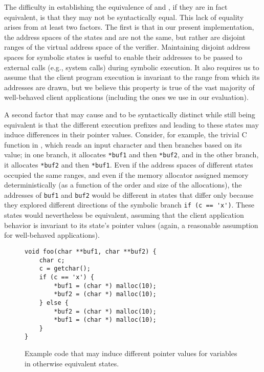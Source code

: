 The difficulty in establishing the equivalence of
 and , if they are in
fact equivalent, is that they may not be syntactically equal.  This
lack of equality arises from at least two factors.  The first is that
in our present implementation, the address spaces of the states
 and  are not the same,
but rather are disjoint ranges of the virtual address space of the
verifier.  Maintaining disjoint address spaces for symbolic states is
useful to enable their addresses to be passed to external calls (e.g.,
system calls) during symbolic execution.  It also requires us to
assume that the client program execution is invariant to the range
from which its addresses are drawn, but we believe this property is
true of the vast majority of well-behaved client applications
(including the ones we use in our evaluation).

A second factor that may cause  and
 to be syntactically distinct while still
being equivalent is that the different execution prefixes
 and  leading to
these states may induce differences in their pointer values.
Consider, for example, the trivial C function in
, which reads an input character and then
branches based on its value; in one branch, it allocates \verb|*buf1|
and then \verb|*buf2|, and in the other branch, it allocates
\verb|*buf2| and then \verb|*buf1|.  Even if the address spaces of
different states occupied the same ranges, and even if the memory
allocator assigned memory deterministically (as a function of the
order and size of the allocations), the addresses of
\verb|buf1| and \verb|buf2| would be different in states that differ
only because they explored different directions of the symbolic branch
\verb|if (c == 'x')|.  These states would nevertheless be equivalent,
assuming that the client application behavior is invariant to its
state's pointer values (again, a reasonable assumption for
well-behaved applications).

\begin{figure}[H]
\centering
\begin{minipage}{0.6\columnwidth}
\centering
\lstset{numbers=none,basicstyle=\small\ttfamily}
\begin{lstlisting}
void foo(char **buf1, char **buf2) {
    char c;
    c = getchar();
    if (c == 'x') {
        *buf1 = (char *) malloc(10);
        *buf2 = (char *) malloc(10);
    } else {
        *buf2 = (char *) malloc(10);
        *buf1 = (char *) malloc(10);
    }
}
\end{lstlisting}
\end{minipage}

\caption{Example code that may induce different pointer values for
variables in otherwise equivalent states. \label{fig:diverge}}
\end{figure}

